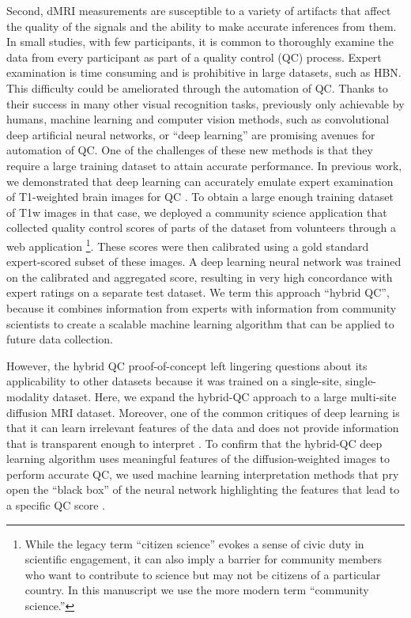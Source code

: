 \documentclass[fleqn,10pt]{wlscirep}
\begin{document}
Second, dMRI measurements are susceptible to a variety of artifacts that affect
the quality of the signals and the ability to make accurate inferences from them.
In small studies, with few participants, it is common to thoroughly examine the
data from every participant as part of a quality control (QC) process. Expert
examination is time consuming and is prohibitive in large datasets, such as HBN.
This difficulty could be ameliorated through the automation of QC. Thanks to
their success in many other visual recognition tasks, previously only achievable
by humans, machine learning and computer vision methods, such as convolutional
deep artificial neural networks, or ``deep learning'' \cite{lecun2015deep}
are promising avenues for automation of QC. One
of the challenges of these new methods is that they require a large training
dataset to attain accurate performance. In previous work, we demonstrated that
deep learning can accurately emulate expert examination of T1-weighted brain
images for QC \cite{keshavan2019-er}. To obtain a large enough training dataset of
T1w images in that case, we deployed a community science application that
collected quality control scores of parts of the dataset from volunteers through
a web application \footnote{%
    While the legacy term ``citizen science'' evokes a sense of civic duty in
    scientific engagement, it can also imply a barrier for community members who
    want to contribute to science but may not be citizens of a particular
    country. In this manuscript we use the more modern term ``community
    science.''
}.
These scores were then calibrated using a gold standard expert-scored subset of
these images. A deep learning neural network was trained on the calibrated and
aggregated score, resulting in very high concordance with expert ratings on a
separate test dataset. We term this approach ``hybrid QC'', because it combines
information from experts with information from community scientists to create a
scalable machine learning algorithm that can be applied to future data
collection.

However, the hybrid QC proof-of-concept left lingering questions about its
applicability to other datasets because it was trained on a single-site,
single-modality dataset. Here, we expand the hybrid-QC approach to a large
multi-site diffusion MRI dataset. Moreover, one of the common critiques of deep
learning is that it can learn irrelevant features of the data and does not
provide information that is transparent enough to interpret
\cite{lipton2017doctor, salahuddin2022transparency, Zech2018-ki}. To confirm
that the hybrid-QC deep learning algorithm uses meaningful features of the
diffusion-weighted images to perform accurate QC, we used machine learning
interpretation methods that pry open the ``black box'' of the neural network
highlighting the features that lead to a specific QC score
\cite{sundararajan2017axiomatic,murdoch2019definitions}.
\end{document}
